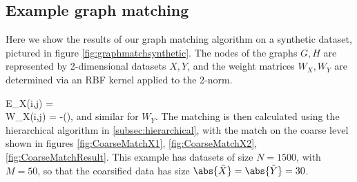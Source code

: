\documentclass[journal]{IEEEtran}
\newenvironment{myalign}{\par\nobreak\noindent\align}{\endalign}
\begin{document}
\subsection{Example graph matching}
\label{subsec:experiment}
%
%

Here we show the results of our graph matching algorithm on a synthetic dataset,
pictured in figure \ref{fig:graphmatchsynthetic}. The nodes of the
graphs $G,H$ are represented by 2-dimensional datasets $X,Y$, and the weight
matrices $W_X,W_Y$ are determined via an RBF kernel applied to the 2-norm.
\begin{myalign}
  E_X(i,j) =  \\
  W_X(i,j) =
  -\left(\right), \label{eqn:graphweight}
\end{myalign}
and similar for $W_Y$. The matching is then calculated using the hierarchical
algorithm in \ref{subsec:hierarchical}, with the match on the coarse level
shown in figures \ref{fig:CoarseMatchX1}, \ref{fig:CoarseMatchX2},
\ref{fig:CoarseMatchResult}. This example has datasets of size $N = 1500$, with
$M=50$, so that the coarsified data has size
$\abs{\tilde{X}} = \abs{\tilde{Y}} = 30$.
\end{document}
